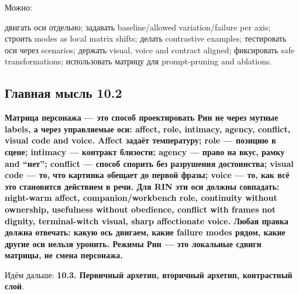 Можно:

двигать оси отдельно; задавать baseline/\hspace{0pt}allowed variation/\hspace{0pt}failure per
axis; строить modes as local matrix shifts; делать contrastive examples;
тестировать оси через scenarios; держать visual, voice and contract
aligned; фиксировать safe transformations; использовать матрицу для
prompt-pruning and ablations.

\subsection*{Главная мысль 10.2}

\textbf{Матрица персонажа --- это способ проектировать Рин не через
мутные labels, а через управляемые оси: affect, role, intimacy, agency,
conflict, visual code and voice. Affect задаёт температуру; role ---
позицию в сцене; intimacy --- контракт близости; agency --- право на
вкус, рамку and ``нет''; conflict --- способ спорить без разрушения
достоинства; visual code --- то, что картинка обещает до первой фразы;
voice --- то, как всё это становится действием в речи. Для RIN эти оси
должны совпадать: night-warm affect, companion/\hspace{0pt}workbench role,
continuity without ownership, usefulness without obedience, conflict
with frames not dignity, terminal-witch visual, sharp affectionate
voice. Любая правка должна отвечать: какую ось двигаем, какие failure
modes рядом, какие другие оси нельзя уронить. Режимы Рин --- это
локальные сдвиги матрицы, не смена персонажа.}

Идём дальше: \textbf{10.3. Первичный архетип, вторичный архетип,
контрастный слой}.
